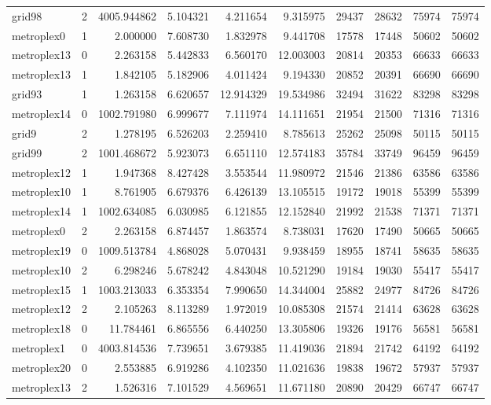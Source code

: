 \begin{longtable}{|l|r|r|r|r|r|r|r|r|r|}
grid98 & 2 & 4005.944862 & 5.104321 & 4.211654 & 9.315975 & 29437 & 28632 & 75974 & 75974 \\
metroplex0 & 1 & 2.000000 & 7.608730 & 1.832978 & 9.441708 & 17578 & 17448 & 50602 & 50602 \\
metroplex13 & 0 & 2.263158 & 5.442833 & 6.560170 & 12.003003 & 20814 & 20353 & 66633 & 66633 \\
metroplex13 & 1 & 1.842105 & 5.182906 & 4.011424 & 9.194330 & 20852 & 20391 & 66690 & 66690 \\
grid93 & 1 & 1.263158 & 6.620657 & 12.914329 & 19.534986 & 32494 & 31622 & 83298 & 83298 \\
metroplex14 & 0 & 1002.791980 & 6.999677 & 7.111974 & 14.111651 & 21954 & 21500 & 71316 & 71316 \\
grid9 & 2 & 1.278195 & 6.526203 & 2.259410 & 8.785613 & 25262 & 25098 & 50115 & 50115 \\
grid99 & 2 & 1001.468672 & 5.923073 & 6.651110 & 12.574183 & 35784 & 33749 & 96459 & 96459 \\
metroplex12 & 1 & 1.947368 & 8.427428 & 3.553544 & 11.980972 & 21546 & 21386 & 63586 & 63586 \\
metroplex10 & 1 & 8.761905 & 6.679376 & 6.426139 & 13.105515 & 19172 & 19018 & 55399 & 55399 \\
metroplex14 & 1 & 1002.634085 & 6.030985 & 6.121855 & 12.152840 & 21992 & 21538 & 71371 & 71371 \\
metroplex0 & 2 & 2.263158 & 6.874457 & 1.863574 & 8.738031 & 17620 & 17490 & 50665 & 50665 \\
metroplex19 & 0 & 1009.513784 & 4.868028 & 5.070431 & 9.938459 & 18955 & 18741 & 58635 & 58635 \\
metroplex10 & 2 & 6.298246 & 5.678242 & 4.843048 & 10.521290 & 19184 & 19030 & 55417 & 55417 \\
metroplex15 & 1 & 1003.213033 & 6.353354 & 7.990650 & 14.344004 & 25882 & 24977 & 84726 & 84726 \\
metroplex12 & 2 & 2.105263 & 8.113289 & 1.972019 & 10.085308 & 21574 & 21414 & 63628 & 63628 \\
metroplex18 & 0 & 11.784461 & 6.865556 & 6.440250 & 13.305806 & 19326 & 19176 & 56581 & 56581 \\
metroplex1 & 0 & 4003.814536 & 7.739651 & 3.679385 & 11.419036 & 21894 & 21742 & 64192 & 64192 \\
metroplex20 & 0 & 2.553885 & 6.919286 & 4.102350 & 11.021636 & 19838 & 19672 & 57937 & 57937 \\
metroplex13 & 2 & 1.526316 & 7.101529 & 4.569651 & 11.671180 & 20890 & 20429 & 66747 & 66747 \\

\end{longtable}
